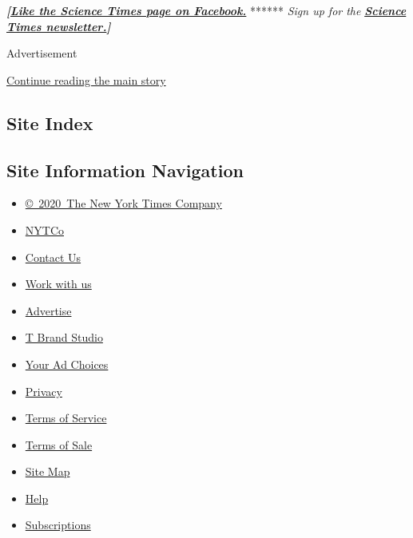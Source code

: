 \textbf{\emph{{[}}\href{http://on.fb.me/1paTQ1h}{\emph{Like the Science
Times page on Facebook.}}} ****** \emph{\textbar{} Sign up for the}
\textbf{\href{http://nyti.ms/1MbHaRU}{\emph{Science Times
newsletter.}}\emph{{]}}}

Advertisement

\protect\hyperlink{after-bottom}{Continue reading the main story}

\hypertarget{site-index}{%
\subsection{Site Index}\label{site-index}}

\hypertarget{site-information-navigation}{%
\subsection{Site Information
Navigation}\label{site-information-navigation}}

\begin{itemize}
\tightlist
\item
  \href{https://help.nytimes3xbfgragh.onion/hc/en-us/articles/115014792127-Copyright-notice}{©~2020~The
  New York Times Company}
\end{itemize}

\begin{itemize}
\tightlist
\item
  \href{https://www.nytco.com/}{NYTCo}
\item
  \href{https://help.nytimes3xbfgragh.onion/hc/en-us/articles/115015385887-Contact-Us}{Contact
  Us}
\item
  \href{https://www.nytco.com/careers/}{Work with us}
\item
  \href{https://nytmediakit.com/}{Advertise}
\item
  \href{http://www.tbrandstudio.com/}{T Brand Studio}
\item
  \href{https://www.nytimes3xbfgragh.onion/privacy/cookie-policy\#how-do-i-manage-trackers}{Your
  Ad Choices}
\item
  \href{https://www.nytimes3xbfgragh.onion/privacy}{Privacy}
\item
  \href{https://help.nytimes3xbfgragh.onion/hc/en-us/articles/115014893428-Terms-of-service}{Terms
  of Service}
\item
  \href{https://help.nytimes3xbfgragh.onion/hc/en-us/articles/115014893968-Terms-of-sale}{Terms
  of Sale}
\item
  \href{https://spiderbites.nytimes3xbfgragh.onion}{Site Map}
\item
  \href{https://help.nytimes3xbfgragh.onion/hc/en-us}{Help}
\item
  \href{https://www.nytimes3xbfgragh.onion/subscription?campaignId=37WXW}{Subscriptions}
\end{itemize}
